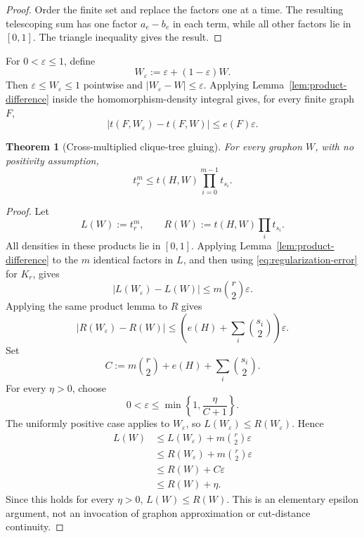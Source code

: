 \documentclass[11pt]{article}
\newtheorem{theorem}{Theorem}
\begin{document}
\begin{proof}
Order the finite set and replace the factors one at a time.  The resulting
telescoping sum has one factor \(a_e-b_e\) in each term, while all other
factors lie in \([0,1]\).  The triangle inequality gives the result.
\end{proof}

For \(0<\varepsilon\le1\), define
\[
    W_\varepsilon
    :=
    \varepsilon+(1-\varepsilon)W.
\]
Then \(\varepsilon\le W_\varepsilon\le1\) pointwise and
\(|W_\varepsilon-W|\le\varepsilon\).  Applying
Lemma~\ref{lem:product-difference} inside the homomorphism-density integral
gives, for every finite graph \(F\),
\begin{equation}\label{eq:regularization-error}
    |t(F,W_\varepsilon)-t(F,W)|
    \le
    e(F)\varepsilon.
\end{equation}

\begin{theorem}[Cross-multiplied clique-tree gluing]\label{thm:gluing}
For every graphon \(W\), with no positivity assumption,
\[
    t_r^m
    \le
    t(H,W)\prod_{i=0}^{m-1}t_{s_i}.
\]
\end{theorem}

\begin{proof}
Let
\[
    L(W):=t_r^m,
    \qquad
    R(W):=t(H,W)\prod_i t_{s_i}.
\]
All densities in these products lie in \([0,1]\).  Applying
Lemma~\ref{lem:product-difference} to the \(m\) identical factors in \(L\),
and then using \eqref{eq:regularization-error} for \(K_r\), gives
\[
    |L(W_\varepsilon)-L(W)|
    \le
    m\binom r2\varepsilon.
\]
Applying the same product lemma to \(R\) gives
\[
    |R(W_\varepsilon)-R(W)|
    \le
    \left(e(H)+\sum_i\binom{s_i}{2}\right)\varepsilon.
\]
Set
\[
    C:=m\binom r2+e(H)+\sum_i\binom{s_i}{2}.
\]
For every \(\eta>0\), choose
\[
    0<\varepsilon\le
    \min\left\{1,\frac{\eta}{C+1}\right\}.
\]
The uniformly positive case applies to \(W_\varepsilon\), so
\(L(W_\varepsilon)\le R(W_\varepsilon)\).  Hence
\[
\begin{aligned}
    L(W)
    &\le L(W_\varepsilon)+m\binom r2\varepsilon\\
    &\le R(W_\varepsilon)+m\binom r2\varepsilon\\
    &\le R(W)+C\varepsilon\\
    &\le R(W)+\eta.
\end{aligned}
\]
Since this holds for every \(\eta>0\), \(L(W)\le R(W)\).  This is an
elementary epsilon argument, not an invocation of graphon approximation or
cut-distance continuity.
\end{proof}
\end{document}
